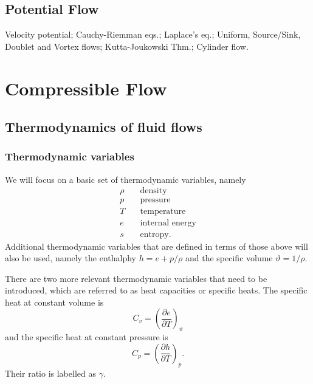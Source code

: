 \documentclass[oneside,a4paper,11pt]{report}
\begin{document}
\chapter{Potential Flow}
Velocity potential; Cauchy-Riemman eqs.; Laplace's eq.; Uniform, Source/Sink, Doublet and Vortex flows; Kutta-Joukowski Thm.; Cylinder flow.

\part{Compressible Flow}
\chapter{Thermodynamics of fluid flows}

\section{Thermodynamic variables}
We will focus on a basic set of thermodynamic variables, namely 
\begin{align}
    \rho & \quad \text{density} \nonumber \\
    p & \quad \text{pressure} \nonumber \\
    T & \quad \text{temperature} \nonumber \\
    e & \quad \text{internal energy} \nonumber \\
    s & \quad \text{entropy}. \nonumber
\end{align}
Additional thermodynamic variables that are defined in terms of those above will also be used, namely the enthalphy $h = e + p/\rho$ and the specific volume $\vartheta = 1/\rho$.

There are two more relevant thermodynamic variables that need to be introduced, which are referred to as heat capacities or specific heats. The specific heat at constant volume is
\begin{equation}
    C_v = \left( \frac{\partial e}{\partial T} \right)_\vartheta
\end{equation}
and the specific heat at constant pressure is
\begin{equation}
    C_p = \left ( \frac{\partial h}{\partial T} \right)_p.
\end{equation}
Their ratio is labelled as $\gamma$.
\end{document}
